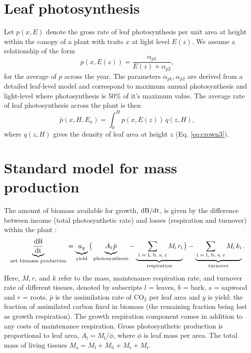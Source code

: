 \documentclass[10pt,twoside]{article}
\begin{document}
\section{Leaf photosynthesis}\label{leaf-photosynthesis}

Let \(p(x, E)\) denote the gross rate of leaf photosynthesis per unit
area at height within the canopy of a plant with traits \(x\) at light
level \(E(z)\). We assume a relationship of the form
\begin{equation}\label{eq:photosynthesis}
p(x, E(z)) = \frac{\alpha_{p1}}{E(z) + \alpha_{p2}},
\end{equation}
for the average of \(p\) across the year. The parameters
\(\alpha_{p1}, \alpha_{p2}\) are derived from a detailed leaf-level
model and correspond to maximum annual photosynthesis and light-level
where photosynthesis is 50\% of it's maximum value. The average rate of
leaf photosynthesis across the plant is then
\begin{equation}\label{eq:photosynthesis_av}
\bar{p}(x, H, E_a) = \int_0^H p(x, E(z)) \, q(z, H),
\end{equation}
where \(q(z, H)\) gives the density of leaf area at height \(z\) (Eq.
\ref{eq:crown3}).

\section{Standard model for mass
production}\label{standard-model-for-mass-production}

The amount of biomass available for growth,
\(\rm{d}B / \rm{d}t\), is given by the difference between income
(total photosynthetic rate) and losses (respiration and turnover) within the
plant \citep{Makela-1997, Thornley-2000, Falster-2011}:
\begin{equation}\label{eq:dbdt}
\underbrace{\strut \frac{\rm{d}B}{\rm{d}t}}_\textrm{net biomass production}
  = \underbrace{\strut a_y}_\textrm{yield}
    \big( \underbrace{\strut A_\textrm{l} \, \bar{p}}_\textrm{photosynthesis} -
     \underbrace{\strut \, \sum_\textrm{i = l, b, s, r}{M_\textrm{i} \, r_\textrm{i}}}_\textrm{respiration}\big)
    - \underbrace{\strut \sum_\textrm{i = l, b, s, r}{M_\textrm{i} \, k_\textrm{i}}}_\textrm{turnover}.
\end{equation}
Here, \(M, r\), and \(k\) refer to the mass, maintenance respiration rate, and
turnover rate of different tissues, denoted by subscripts \(l\) = leaves,
\(b\) = bark, \(s\) = sapwood and \(r\) = roots. \(\bar{p}\) is the assimilation
rate of CO\(_2\) per leaf area and \(y\) is yield: the fraction of
assimilated carbon fixed in biomass (the remaining fraction being lost
as growth respiration). The growth respiration component comes in addition
to any costs of maintenance respiration. Gross photosynthetic production is proportional to leaf area,
\(A_\textrm{l} = M_\textrm{l} / \phi\), where \(\phi\) is leaf mass per
area. The total mass of living tissues
\(M_\textrm{a} = M_\textrm{l} + M_\textrm{b} + M_\textrm{s} + M_\textrm{r}.\)
\end{document}
